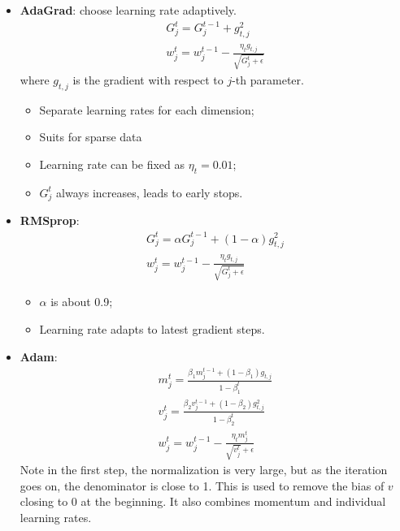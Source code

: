 \documentclass[]{article}
\begin{document}
\begin{itemize}
\begin{itemize}
		\item \textbf{AdaGrad}: choose learning rate adaptively.
		\begin{equation}
		\begin{array}{c}
		G_j^t=G_j^{t-1}+g_{t,j}^2\\
		w_j^t=w_j^{t-1}-\frac{\eta_t g_{t,j}}{\sqrt{G_j^t+\epsilon}}
		\end{array}
		\end{equation}
		where $g_{t,j}$ is the gradient with respect to $j$-th parameter.
		\begin{itemize}
			\item Separate learning rates for each dimension;
			\item Suits for sparse data
			\item Learning rate can be fixed as $\eta_t=0.01$;
			\item $G_j^t$ always increases, leads to early stops.
		\end{itemize}
		
		\item \textbf{RMSprop}:
		\begin{equation}
		\begin{array}{c}
		G_j^t=\alpha G_j^{t-1}+ (1-\alpha) g_{t,j}^2\\
		w_j^t=w_j^{t-1}-\frac{\eta_t g_{t,j}}{\sqrt{G_j^t+\epsilon}}
		\end{array}
		\end{equation}
		\begin{itemize}
			\item $\alpha$ is about 0.9;
			\item Learning rate adapts to latest gradient steps.
		\end{itemize}
		
		\item \textbf{Adam}:
		\begin{equation}
		\begin{array}{c}
		m_j^t=\frac{\beta_1 m_j^{t-1}+(1-\beta_1)g_{t,j}}{1-\beta_1^t}\\
		v_j^t=\frac{\beta_2 v_j^{t-1}+(1-\beta_2)g_{t,j}^2}{1-\beta_2^t}\\
		w_j^t=w_j^{t-1}-\frac{\eta_t m_{j}^t}{\sqrt{v_j^t}+\epsilon}
		\end{array}
		\end{equation}
		Note in the first step, the normalization is very large, but as the iteration goes on, the denominator is close to 1. This is used to remove the bias of $v$ closing to 0 at the beginning. It also combines momentum and individual learning rates.
	\end{itemize}
\end{itemize}
\end{document}
